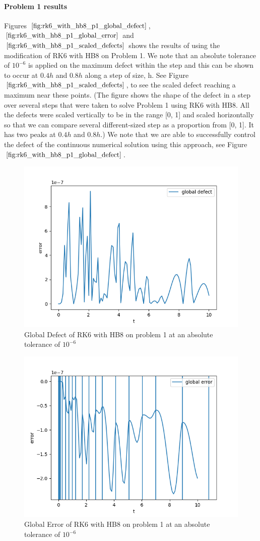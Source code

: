 \documentclass{article}
\begin{document}
\paragraph{Problem 1 results}
Figures $\ref{fig:rk6_with_hb8_p1_global_defect}$, $\ref{fig:rk6_with_hb8_p1_global_error}$ and $\ref{fig:rk6_with_hb8_p1_scaled_defects}$ shows the results of using the modification of RK6 with HB8 on Problem 1. We note that an absolute tolerance of $10^{-6}$ is applied on the maximum defect within the step and this can be shown to occur at $0.4h$ and $0.8h$ along a step of size, h. See Figure $\ref{fig:rk6_with_hb8_p1_scaled_defects}$, to see the scaled defect reaching a maximum near these points. (The figure shows the shape of the defect in a step over several steps that were taken to solve Problem 1 using RK6 with HB8. All the defects were scaled vertically to be in the range [0, 1] and scaled horizontally so that we can compare several different-sized step as a proportion from [0, 1]. It has two peaks at $0.4h$ and $0.8h$.) We note that we are able to successfully control the defect of the continuous numerical solution using this approach, see Figure $\ref{fig:rk6_with_hb8_p1_global_defect}$. 


\begin{figure}[H]
\centering
\includegraphics[width=0.7\linewidth]{./figures/rk6_with_hb8_p1_global_defect}
\caption{Global Defect of RK6 with HB8 on problem 1 at an absolute tolerance of $10^{-6}$}
\label{fig:rk6_with_hb8_p1_global_defect}
\end{figure}

\begin{figure}[H]
\centering
\includegraphics[width=0.7\linewidth]{./figures/rk6_with_hb8_p1_global_error}
\caption{Global Error of RK6 with HB8 on problem 1 at an absolute tolerance of $10^{-6}$}
\label{fig:rk6_with_hb8_p1_global_error}
\end{figure}
\end{document}
